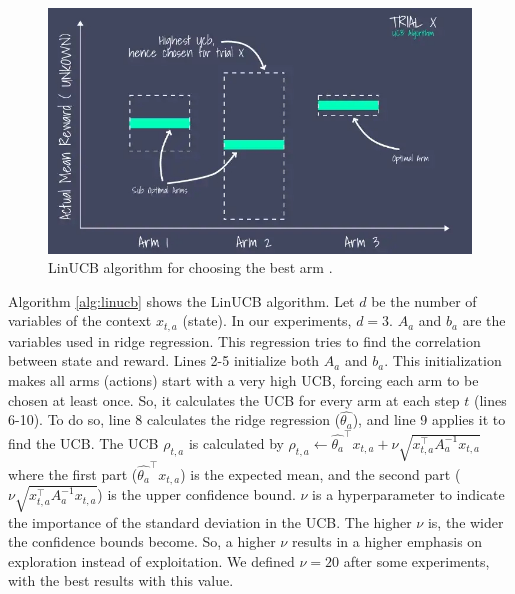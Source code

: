 \begin{figure}[!htb]
    \centering
    \includegraphics[scale=0.58]{Images/Learning_compensations/linucb.jpg}
    \caption{LinUCB algorithm for choosing the best arm \cite{recommender2020}.}
    \label{fig:linucb}
\end{figure}

Algorithm \ref{alg:linucb} shows the LinUCB algorithm. Let $d$ be the number of variables of the context $x_{t,a}$ (state). In our experiments, $d=3$. $A_a$ and $b_a$ are the variables used in ridge regression. This regression tries to find the correlation between state and reward. Lines 2-5 initialize both $A_a$ and $b_a$. This initialization makes all arms (actions) start with a very high UCB, forcing each arm to be chosen at least once. So, it calculates the UCB for every arm at each step $t$ (lines 6-10). To do so, line 8 calculates the ridge regression ($\hat{\theta_a}$), and line 9 applies it to find the UCB. The UCB $\rho_{t, a}$ is calculated by $\rho_{t, a} \leftarrow \hat{\theta_a}^\top x_{t,a} + \nu \sqrt{x_{t,a}^\top A_{a}^{-1} x_{t,a}}$ where the first part ($\hat{\theta_a}^\top x_{t,a}$) is the expected mean, and the second part ($\nu \sqrt{x_{t,a}^\top A_{a}^{-1} x_{t,a}}$) is the upper confidence bound. $\nu$ is a hyperparameter to indicate the importance of the standard deviation in the UCB. The higher $\nu$ is, the wider the confidence bounds become. So, a higher $\nu$ results in a higher emphasis on exploration instead of exploitation. We defined $\nu = 20$ after some experiments, with the best results with this value.

